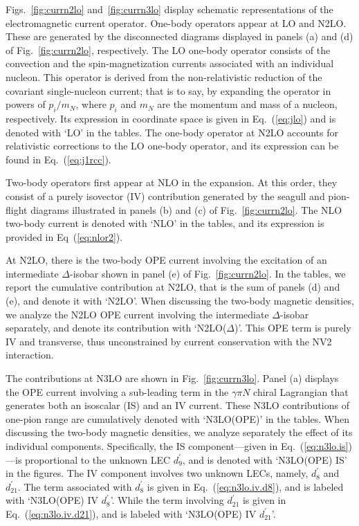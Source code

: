 \documentclass[aps,prc,floatfix,showpacs,twocolumn, preprintnumbers]{revtex4-2}
\begin{document}
 Figs.~\ref{fig:currn2lo} and~\ref{fig:currn3lo} display schematic representations of the electromagnetic current operator. One-body operators appear at LO and N2LO. These are generated by the disconnected diagrams displayed in panels (a) and (d) of Fig.~\ref{fig:currn2lo}, respectively. The LO one-body operator consists of the convection and the spin-magnetization currents associated with an individual nucleon. This operator is derived from the non-relativistic reduction of the covariant single-nucleon current; that is to say, by expanding the operator in powers of $p_i/m_N$, where $p_i$ and $m_N$ are the momentum and mass of a nucleon, respectively. Its expression in coordinate space is given in Eq.~(\ref{eq:jlo}) and is denoted with `LO' in the tables. The one-body operator at N2LO  accounts for relativistic corrections to the LO one-body operator, and its expression can be found in Eq.~(\ref{eq:j1rcc}).

Two-body operators first appear at NLO in the expansion. At this order, they consist of a purely isovector (IV) contribution generated by the seagull and pion-flight diagrams illustrated in panels (b) and (c) of Fig.~\ref{fig:currn2lo}. The NLO two-body current is denoted with `NLO' in the tables, and its expression is provided in Eq~(\ref{eq:nlor2}). 

At N2LO, there is the two-body OPE current involving the excitation of an intermediate $\Delta$-isobar shown in panel (e) of Fig.~\ref{fig:currn2lo}. In the tables, we report the cumulative contribution at N2LO, that is the sum of panels (d) and (e), and denote it with `N2LO'. When discussing the two-body magnetic densities, we analyze the N2LO OPE current involving the intermediate $\Delta$-isobar separately, and denote its contribution with `N2LO($\Delta$)'. This OPE term is purely IV and transverse, thus unconstrained by current conservation with the NV2 interaction. 

The contributions at N3LO are shown in Fig.~\ref{fig:currn3lo}. Panel (a) displays the OPE current involving a sub-leading term in the $\gamma\pi N$ chiral Lagrangian that generates both an isoscalar (IS) and an IV current. These N3LO contributions of one-pion range are cumulatively denoted with `N3LO(OPE)' in the tables. When discussing the two-body magnetic densities, we analyze separately the effect of its individual components. Specifically, the IS component---given in Eq.~(\ref{eq:n3lo.is})---is proportional to the unknown LEC $d_9^\prime$, and is denoted with `N3LO(OPE) IS' in the figures. The IV component involves two unknown LECs, namely, $d_8^\prime$ and $d_{21}^\prime$. The term associated with $d_8^\prime$ is given in Eq.~(\ref{eq:n3lo.iv.d8}), and is labeled with `N3LO(OPE) IV $d_8^\prime$'. While the term involving $d_{21}^\prime$ is given in Eq.~(\ref{eq:n3lo.iv.d21}), and is labeled with `N3LO(OPE) IV $d_{21}^\prime$'. 
\end{document}
